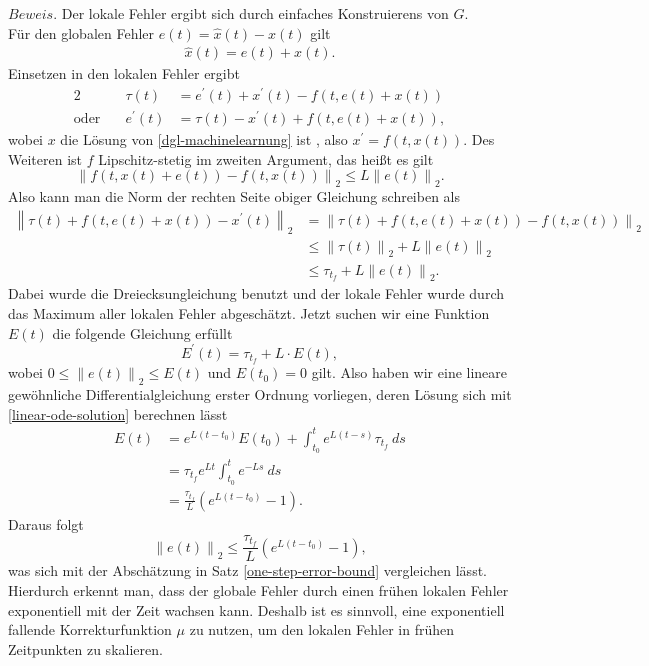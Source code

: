 $Beweis.$ Der lokale Fehler ergibt sich durch einfaches Konstruierens von $G$.\\
Für den globalen Fehler $e(t) = \hat{x}(t) - x(t)$ gilt
\begin{align*}
    \hat{x}(t) = e(t) + x(t).
\end{align*}
Einsetzen in den lokalen Fehler ergibt
\begin{alignat*}{2}
    &\tau(t) &= e^{\prime}(t) + x^{\prime}(t) - f(t,e(t)+x(t))\\
    \text{oder} \quad &e^{\prime}(t) &= \tau(t) - x^{\prime}(t) + f(t,e(t) + x(t)),
\end{alignat*}
wobei $x$ die Lösung von \eqref{dgl-machinelearnung} ist , also $x^{\prime}=f(t,x(t))$. Des Weiteren ist $f$
Lipschitz-stetig im zweiten Argument,
das heißt es gilt
\[
    \left\lVert f(t,x(t)+e(t)) - f(t,x(t)) \right\rVert_2 \leq L \left\lVert e(t) \right\rVert_2.
\]
Also kann man die Norm der rechten Seite obiger Gleichung schreiben als
\begin{align*}
    \left\lVert \tau(t) + f(t,e(t) + x(t)) - x^{\prime}(t) \right\rVert_2
    &= \left\lVert \tau(t) + f(t,e(t) + x(t)) - f(t,x(t)) \right\rVert_2 \\
    &\leq \left\lVert \tau(t) \right\rVert_2 + L\left\lVert e(t) \right\rVert_2 \\
    &\leq \tau_{t_f} + L \left\lVert e(t) \right\rVert_2.
\end{align*}
Dabei wurde die Dreiecksungleichung benutzt und der lokale Fehler wurde durch das Maximum aller lokalen Fehler
abgeschätzt. Jetzt suchen wir eine Funktion $E(t)$ die folgende Gleichung erfüllt
\[
    E^{\prime}(t) = \tau_{t_f} + L \cdot E(t),
\]
wobei $0 \leq \left\lVert e(t) \right\rVert_2 \leq E(t)$ und $E(t_0) = 0$ gilt. Also haben wir eine lineare gewöhnliche
Differentialgleichung erster Ordnung vorliegen, deren Lösung sich mit \eqref{linear-ode-solution} berechnen lässt
\begin{align*}
    E(t) &= e^{L(t-t_0)}E(t_0) + \int_{t_0}^{t}e^{L(t-s)}\tau_{t_f}\ ds \\
    &= \tau_{t_f} e^{Lt} \int_{t_0}^{t}e^{-Ls}\ ds \\
    &= \frac{\tau_{t_f} }{L} \left( e^{L(t-t_0)} - 1 \right).
\end{align*}
Daraus folgt
\[
    \left\lVert e(t) \right\rVert_2 \leq \frac{\tau_{t_f}}{L} \left( e^{L(t-t_0)} - 1 \right),
\]
was sich mit der Abschätzung in Satz \ref{one-step-error-bound} vergleichen lässt. \qedwhite\\
Hierdurch erkennt man, dass der globale Fehler durch einen frühen lokalen Fehler exponentiell mit der Zeit wachsen
kann. Deshalb ist es sinnvoll, eine exponentiell fallende Korrekturfunktion $\mu$ zu nutzen, um den lokalen Fehler in
frühen Zeitpunkten zu skalieren.

